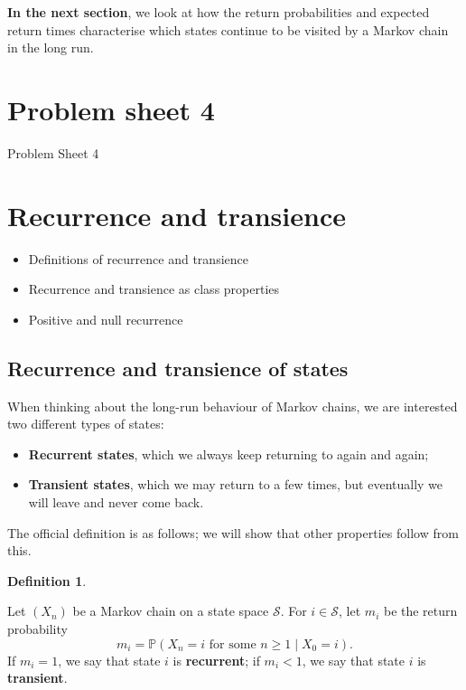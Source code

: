 \documentclass[
  a4paper,
]{article}
\providecommand{\tightlist}{%
  \setlength{\itemsep}{0pt}\setlength{\parskip}{0pt}}
\theoremstyle{definition}
\newtheorem{definition}{Definition}[section]
\theoremstyle{definition}
\theoremstyle{definition}
\theoremstyle{remark}
\begin{document}
\textbf{In the next section}, we look at how the return probabilities and expected return times characterise which states continue to be visited by a Markov chain in the long run.

\hypertarget{P04}{%
\section*{Problem sheet 4}\label{P04}}

Problem Sheet 4

\hypertarget{S09-recurrence-transience}{%
\section{Recurrence and transience}\label{S09-recurrence-transience}}

\begin{itemize}
\tightlist
\item
  Definitions of recurrence and transience
\item
  Recurrence and transience as class properties
\item
  Positive and null recurrence
\end{itemize}

\hypertarget{rec-trans-def}{%
\subsection{Recurrence and transience of states}\label{rec-trans-def}}

When thinking about the long-run behaviour of Markov chains, we are interested two different types of states:

\begin{itemize}
\tightlist
\item
  \textbf{Recurrent states}, which we always keep returning to again and again;
\item
  \textbf{Transient states}, which we may return to a few times, but eventually we will leave and never come back.
\end{itemize}

The official definition is as follows; we will show that other properties follow from this.

\begin{definition}
\protect\hypertarget{def:unlabeled-div-3}{}\label{def:unlabeled-div-3}

Let \((X_n)\) be a Markov chain on a state space \(\mathcal S\). For \(i \in \mathcal S\), let \(m_i\) be the return probability
\[ m_i = \mathbb P(X_n = i \text{ for some $n \geq 1$} \mid X_0 = i) . \]
If \(m_i = 1\), we say that state \(i\) is \textbf{recurrent}; if \(m_i < 1\), we say that state \(i\) is \textbf{transient}.

\end{definition}
\end{document}
